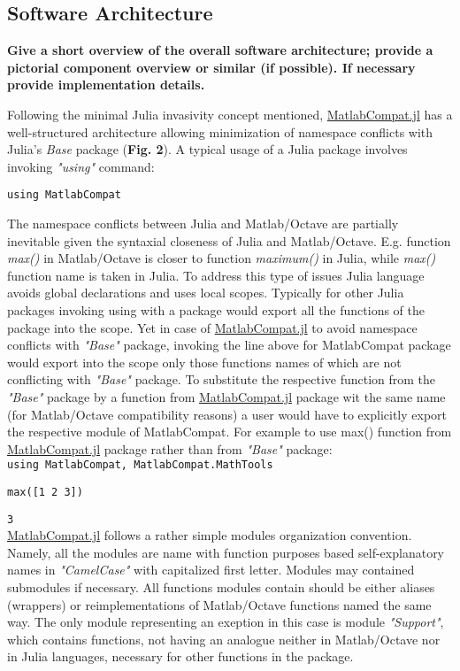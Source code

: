 \subsection{Software Architecture}
\label{Architecture} 

\textbf{Give a short overview of the overall software architecture; provide a pictorial component overview or similar (if possible). If necessary provide implementation details.}

Following the minimal Julia invasivity concept mentioned, \href{https://github.com/MatlabCompat/MatlabCompat.jl}{MatlabCompat.jl} has a well-structured architecture allowing minimization of namespace conflicts with Julia's \textit{Base} package (\textbf{Fig. 2}). A typical usage of a Julia package involves invoking \textit{"using"} command:

\verb|using MatlabCompat|

The namespace conflicts between Julia and Matlab/Octave are partially inevitable given the syntaxial closeness of Julia and Matlab/Octave. E.g. function \textit{max()} in Matlab/Octave is closer to function \textit{maximum()} in Julia, while \textit{max()} function name is taken in Julia. To address this type of issues Julia language avoids global declarations and uses local scopes. Typically for other Julia packages invoking using with a package would export all the functions of the package into the scope. Yet in case of \href{https://github.com/MatlabCompat/MatlabCompat.jl}{MatlabCompat.jl} to avoid namespace conflicts with \textit{"Base"} package, invoking the line above for MatlabCompat package would export into the scope only those functions names of which are not conflicting with \textit{"Base"} package. To substitute the respective function from the \textit{"Base"} package by a function from \href{https://github.com/MatlabCompat/MatlabCompat.jl}{MatlabCompat.jl} package wit the same name (for Matlab/Octave compatibility reasons) a user would have to explicitly export the respective module of MatlabCompat. For example to use max() function from \href{https://github.com/MatlabCompat/MatlabCompat.jl}{MatlabCompat.jl} package rather than from \textit{"Base"} package:\\

\verb|using MatlabCompat, MatlabCompat.MathTools|

\verb|max([1 2 3])|

\verb|3|\\


\href{https://github.com/MatlabCompat/MatlabCompat.jl}{MatlabCompat.jl} follows a rather simple modules organization convention. Namely, all the modules are name with function purposes based self-explanatory names in \textit{"CamelCase"} with capitalized first letter. Modules may contained submodules if necessary. All functions modules contain should be either aliases (wrappers) or reimplementations of Matlab/Octave functions named the same way. The only module representing an exeption in this case is module \textit{"Support"}, which contains functions, not having an analogue neither in Matlab/Octave nor in Julia languages, necessary for other functions in the package.

